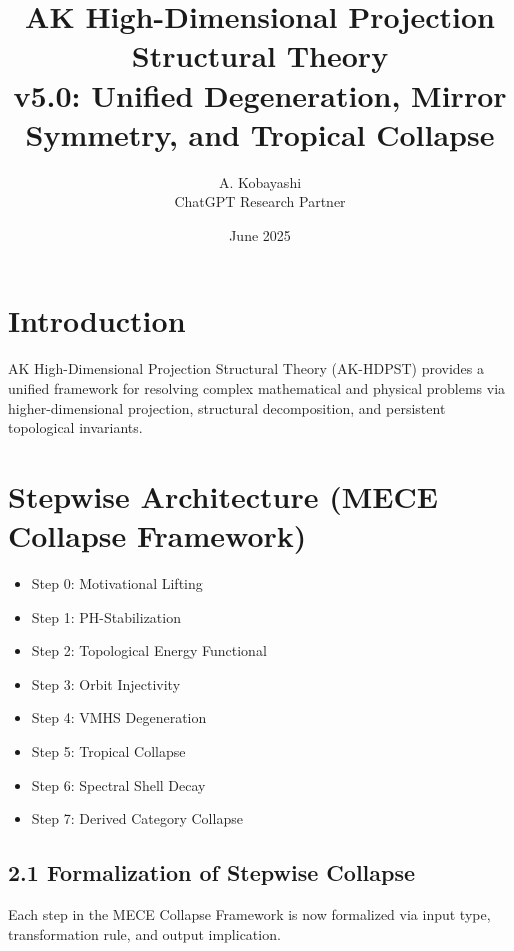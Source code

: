 \documentclass[11pt]{article}
\title{AK High-Dimensional Projection Structural Theory\\
\large v5.0: Unified Degeneration, Mirror Symmetry, and Tropical Collapse}
\author{A. Kobayashi \\ ChatGPT Research Partner}
\date{June 2025}
\begin{document}
\maketitle

\tableofcontents
\newpage


\section{Introduction}
AK High-Dimensional Projection Structural Theory (AK-HDPST) provides a unified framework for resolving complex mathematical and physical problems via higher-dimensional projection, structural decomposition, and persistent topological invariants.


\section{Stepwise Architecture (MECE Collapse Framework)}
\begin{itemize}
    \item Step 0: Motivational Lifting
    \item Step 1: PH-Stabilization
    \item Step 2: Topological Energy Functional
    \item Step 3: Orbit Injectivity
    \item Step 4: VMHS Degeneration
    \item Step 5: Tropical Collapse
    \item Step 6: Spectral Shell Decay
    \item Step 7: Derived Category Collapse
\end{itemize}

\subsection*{2.1 Formalization of Stepwise Collapse}

Each step in the MECE Collapse Framework is now formalized via input type, transformation rule, and output implication.
\end{document}
